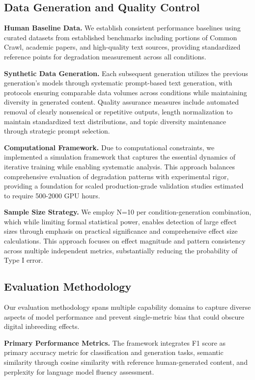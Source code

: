 \documentclass{article}
\begin{document}
\subsection{Data Generation and Quality Control}

\textbf{Human Baseline Data.} We establish consistent performance baselines using curated datasets from established benchmarks including portions of Common Crawl, academic papers, and high-quality text sources, providing standardized reference points for degradation measurement across all conditions.

\textbf{Synthetic Data Generation.} Each subsequent generation utilizes the previous generation's models through systematic prompt-based text generation, with protocols ensuring comparable data volumes across conditions while maintaining diversity in generated content. Quality assurance measures include automated removal of clearly nonsensical or repetitive outputs, length normalization to maintain standardized text distributions, and topic diversity maintenance through strategic prompt selection.

\textbf{Computational Framework.} Due to computational constraints, we implemented a simulation framework that captures the essential dynamics of iterative training while enabling systematic analysis. This approach balances comprehensive evaluation of degradation patterns with experimental rigor, providing a foundation for scaled production-grade validation studies estimated to require 500-2000 GPU hours.

\textbf{Sample Size Strategy.} We employ N=10 per condition-generation combination, which while limiting formal statistical power, enables detection of large effect sizes through emphasis on practical significance and comprehensive effect size calculations. This approach focuses on effect magnitude and pattern consistency across multiple independent metrics, substantially reducing the probability of Type I error.

\subsection{Evaluation Methodology}

Our evaluation methodology spans multiple capability domains to capture diverse aspects of model performance and prevent single-metric bias that could obscure digital inbreeding effects.

\textbf{Primary Performance Metrics.} The framework integrates F1 score as primary accuracy metric for classification and generation tasks, semantic similarity through cosine similarity with reference human-generated content, and perplexity for language model fluency assessment.
\end{document}
